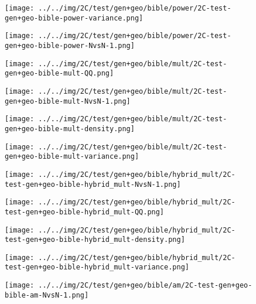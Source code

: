 \begin{figure}[H]
\centering	\texttt{[image: ../../img/2C/test/gen+geo/bible/power/2C-test-gen+geo-bible-power-variance.png]}
\end{figure}
\begin{figure}[H]
\centering	\texttt{[image: ../../img/2C/test/gen+geo/bible/power/2C-test-gen+geo-bible-power-NvsN-1.png]}
\end{figure}
\begin{figure}[H]
\centering	\texttt{[image: ../../img/2C/test/gen+geo/bible/mult/2C-test-gen+geo-bible-mult-QQ.png]}
\end{figure}
\begin{figure}[H]
\centering	\texttt{[image: ../../img/2C/test/gen+geo/bible/mult/2C-test-gen+geo-bible-mult-NvsN-1.png]}
\end{figure}
\begin{figure}[H]
\centering	\texttt{[image: ../../img/2C/test/gen+geo/bible/mult/2C-test-gen+geo-bible-mult-density.png]}
\end{figure}
\begin{figure}[H]
\centering	\texttt{[image: ../../img/2C/test/gen+geo/bible/mult/2C-test-gen+geo-bible-mult-variance.png]}
\end{figure}
\begin{figure}[H]
\centering	\texttt{[image: ../../img/2C/test/gen+geo/bible/hybrid\_mult/2C-test-gen+geo-bible-hybrid\_mult-NvsN-1.png]}
\end{figure}
\begin{figure}[H]
\centering	\texttt{[image: ../../img/2C/test/gen+geo/bible/hybrid\_mult/2C-test-gen+geo-bible-hybrid\_mult-QQ.png]}
\end{figure}
\begin{figure}[H]
\centering	\texttt{[image: ../../img/2C/test/gen+geo/bible/hybrid\_mult/2C-test-gen+geo-bible-hybrid\_mult-density.png]}
\end{figure}
\begin{figure}[H]
\centering	\texttt{[image: ../../img/2C/test/gen+geo/bible/hybrid\_mult/2C-test-gen+geo-bible-hybrid\_mult-variance.png]}
\end{figure}
\begin{figure}[H]
\centering	\texttt{[image: ../../img/2C/test/gen+geo/bible/am/2C-test-gen+geo-bible-am-NvsN-1.png]}
\end{figure}
